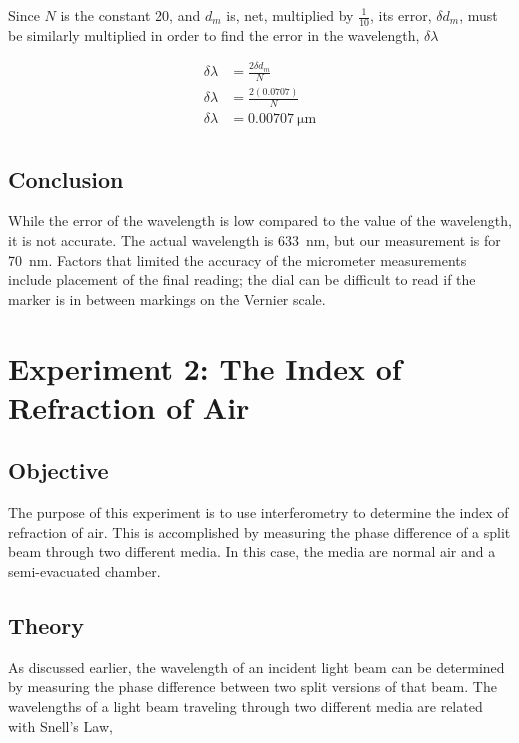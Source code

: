 \documentclass[12pt]{article}
\begin{document}
Since \(N\) is the constant 20, and \(d_m\) is, net, multiplied by
\(\frac{1}{10}\), its error, \(\delta d_m\), must be similarly multiplied in
order to find the error in the wavelength, \(\delta \lambda\)

\begin{align*}
  \delta \lambda &= \frac{2 \delta d_m}{N} \\
  \delta \lambda &= \frac{2 (\num{0.0707})}{N} \\
  \delta \lambda &= \SI{0.00707}{\micro\meter} \\
\end{align*}

\subsection{Conclusion}

\qq While the error of the wavelength is low compared to the value of the
wavelength, it is not accurate. The actual wavelength is \SI{633}{\nano\meter},
but our measurement is for \SI{70}{\nano\meter}. Factors that limited the
accuracy of the micrometer measurements include placement of the final reading;
the dial can be difficult to read if the marker is in between markings on the
Vernier scale.



\section{Experiment 2: The Index of Refraction of Air}

\subsection{Objective}

\qq The purpose of this experiment is to use interferometry to determine the
index of refraction of air. This is accomplished by measuring the phase
difference of a split beam through two different media. In this case, the media
are normal air and a semi-evacuated chamber.   

\subsection{Theory}

\qq As discussed earlier, the wavelength of an incident light beam can be
determined by measuring the phase difference between two split versions of that
beam. The wavelengths of a light beam traveling through two different media are
related with Snell's Law, 
\end{document}
